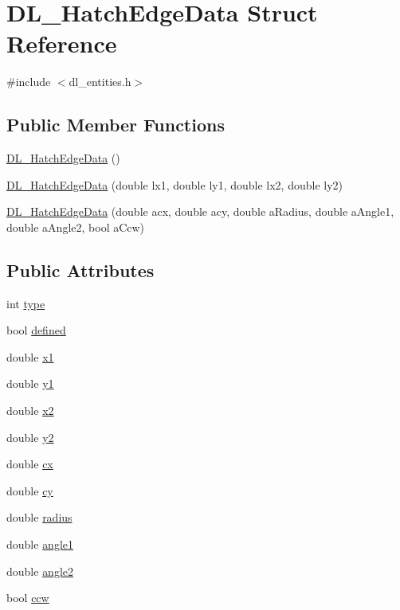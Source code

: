 \hypertarget{structDL__HatchEdgeData}{\section{D\-L\-\_\-\-Hatch\-Edge\-Data Struct Reference}
\label{structDL__HatchEdgeData}
}


{\ttfamily \#include $<$dl\-\_\-entities.\-h$>$}

\subsection*{Public Member Functions}
\begin{DoxyCompactItemize}
\item 
\hyperlink{structDL__HatchEdgeData_ac61e700437989b4de51d72ac0f037fca}{D\-L\-\_\-\-Hatch\-Edge\-Data} ()
\item 
\hyperlink{structDL__HatchEdgeData_a1bff3c275616cc4dabfc8e65af4cde2a}{D\-L\-\_\-\-Hatch\-Edge\-Data} (double lx1, double ly1, double lx2, double ly2)
\item 
\hyperlink{structDL__HatchEdgeData_aae67881d73418935b2458b2cf51ecd53}{D\-L\-\_\-\-Hatch\-Edge\-Data} (double acx, double acy, double a\-Radius, double a\-Angle1, double a\-Angle2, bool a\-Ccw)
\end{DoxyCompactItemize}
\subsection*{Public Attributes}
\begin{DoxyCompactItemize}
\item 
int \hyperlink{structDL__HatchEdgeData_aa96eb140c30b436e50c7eca28c6684fb}{type}
\item 
bool \hyperlink{structDL__HatchEdgeData_aea9a928129f785b8f588e448622128a8}{defined}
\item 
double \hyperlink{structDL__HatchEdgeData_a74a53d008d4d844c4301d3dbea329deb}{x1}
\item 
double \hyperlink{structDL__HatchEdgeData_acabe11145ee03a08a6a67fe736a77a4f}{y1}
\item 
double \hyperlink{structDL__HatchEdgeData_a07e6f723bbc500d5a278f56102a95710}{x2}
\item 
double \hyperlink{structDL__HatchEdgeData_a8f8ebf143e0b70985add9bfd10590e06}{y2}
\item 
double \hyperlink{structDL__HatchEdgeData_a8ba08012de0f12f158cdc795e8321229}{cx}
\item 
double \hyperlink{structDL__HatchEdgeData_ad2d8f9dca1aa2e97f2c1b823713aa977}{cy}
\item 
double \hyperlink{structDL__HatchEdgeData_acdec94f7b83716a78ccbecc68bea3370}{radius}
\item 
double \hyperlink{structDL__HatchEdgeData_a8aaf90ec84f6676519eb8249aa598466}{angle1}
\item 
double \hyperlink{structDL__HatchEdgeData_a8c1333618057dad82fcaa753026013ef}{angle2}
\item 
bool \hyperlink{structDL__HatchEdgeData_a5890ff568b0337854d32adf3bef5645c}{ccw}
\end{DoxyCompactItemize}


